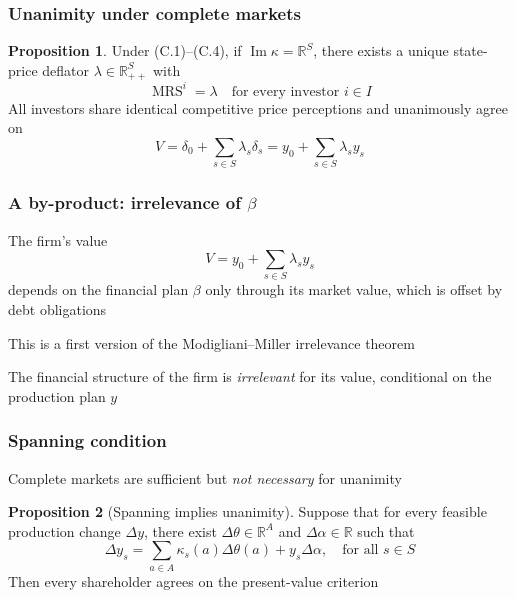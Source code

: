 \documentclass[blue]{beamer}
\def\R{\mathbb{R}}
\DeclareMathOperator\MRS{MRS}
\DeclareMathOperator\Range{Im}
\theoremstyle{definition}
\theoremstyle{example}
\newtheorem*{proposition}{Proposition}
\begin{document}
\begin{frame}\frametitle{Unanimity under complete markets}
\begin{proposition}
Under (C.1)--(C.4), if $\Range \kappa = \R^S$, there exists a unique state-price deflator $\lambda \in \R^S_{++}$ with
\begin{equation*}
\MRS^i = \lambda \quad \text{for every investor } i \in I
\end{equation*}
All investors share identical competitive price perceptions and unanimously agree on
\begin{equation*}
V = \delta_0 + \sum_{s \in S} \lambda_s \delta_s = y_0 + \sum_{s \in S} \lambda_s y_s
\end{equation*}
\end{proposition}
\end{frame}

\begin{frame}\frametitle{A by-product: irrelevance of $\beta$}
The firm's value
\begin{equation*}
V = y_0 + \sum_{s \in S} \lambda_s y_s
\end{equation*}
depends on the financial plan $\beta$ only through its market value, which is offset by debt obligations
\bigskip

This is a first version of the \alert{Modigliani--Miller irrelevance theorem}
\bigskip

The financial structure of the firm is \emph{irrelevant} for its value, conditional on the production plan $y$
\end{frame}

\begin{frame}\frametitle{Spanning condition}
Complete markets are sufficient but \emph{not necessary} for unanimity
\bigskip

\begin{proposition}[Spanning implies unanimity]
Suppose that for every feasible production change $\Delta y$, there exist $\Delta \theta \in \R^A$ and $\Delta \alpha \in \R$ such that
\begin{equation*}
\Delta y_s = \sum_{a \in A} \kappa_s(a) \Delta \theta(a) + y_s \Delta \alpha,
\quad \text{for all $s \in S$}
\end{equation*}
Then every shareholder agrees on the present-value criterion
\end{proposition}
\end{frame}
\end{document}
